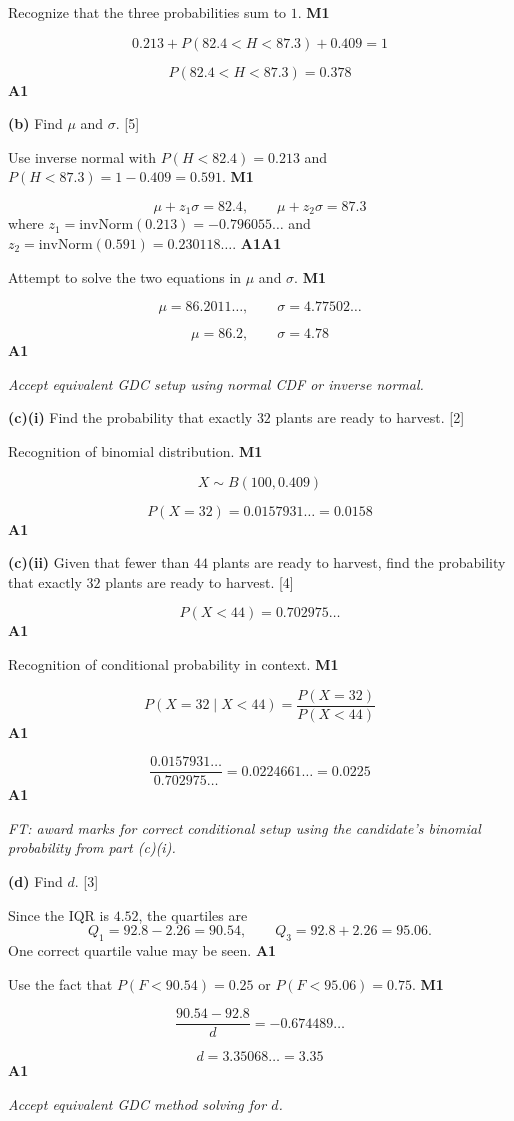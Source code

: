 \documentclass[12pt, twoside]{article}
\begin{document}
\begin{enumerate}[itemsep=0.3cm]
Recognize that the three probabilities sum to $1$. \hfill \textbf{M1}

\[
0.213+P(82.4<H<87.3)+0.409=1
\]

\[
P(82.4<H<87.3)=0.378
\]
\hfill \textbf{A1}

\medskip

\textbf{(b)} Find $\mu$ and $\sigma$. \hfill [5]

Use inverse normal with $P(H<82.4)=0.213$ and
$P(H<87.3)=1-0.409=0.591$. \hfill \textbf{M1}

\[
\mu+z_{1}\sigma=82.4,\qquad \mu+z_{2}\sigma=87.3
\]
where $z_1=\text{invNorm}(0.213)=-0.796055\ldots$ and
$z_2=\text{invNorm}(0.591)=0.230118\ldots$. \hfill \textbf{A1A1}

Attempt to solve the two equations in $\mu$ and $\sigma$. \hfill \textbf{M1}

\[
\mu=86.2011\ldots,\qquad \sigma=4.77502\ldots
\]

\[
\mu=86.2,\qquad \sigma=4.78
\]
\hfill \textbf{A1}

\emph{Accept equivalent GDC setup using normal CDF or inverse normal.}

\medskip

\textbf{(c)(i)} Find the probability that exactly $32$ plants are ready
to harvest. \hfill [2]

Recognition of binomial distribution. \hfill \textbf{M1}

\[
X\sim B(100,0.409)
\]

\[
P(X=32)=0.0157931\ldots=0.0158
\]
\hfill \textbf{A1}

\medskip

\textbf{(c)(ii)} Given that fewer than $44$ plants are ready to harvest,
find the probability that exactly $32$ plants are ready to harvest.
\hfill [4]

\[
P(X<44)=0.702975\ldots
\]
\hfill \textbf{A1}

Recognition of conditional probability in context. \hfill \textbf{M1}

\[
P(X=32\mid X<44)=\frac{P(X=32)}{P(X<44)}
\]
\hfill \textbf{A1}

\[
\frac{0.0157931\ldots}{0.702975\ldots}=0.0224661\ldots=0.0225
\]
\hfill \textbf{A1}

\emph{FT: award marks for correct conditional setup using the
candidate's binomial probability from part (c)(i).}

\medskip

\textbf{(d)} Find $d$. \hfill [3]

Since the IQR is $4.52$, the quartiles are
\[
Q_1=92.8-2.26=90.54,\qquad Q_3=92.8+2.26=95.06.
\]
One correct quartile value may be seen. \hfill \textbf{A1}

Use the fact that $P(F<90.54)=0.25$ or $P(F<95.06)=0.75$.
\hfill \textbf{M1}

\[
\frac{90.54-92.8}{d}=-0.674489\ldots
\]

\[
d=3.35068\ldots=3.35
\]
\hfill \textbf{A1}

\emph{Accept equivalent GDC method solving for $d$.}

\end{enumerate}
\end{document}
